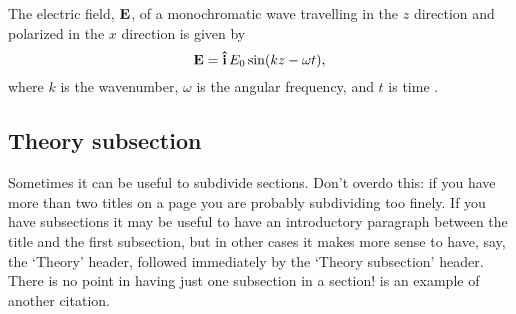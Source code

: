 \documentclass[11pt]{article} %
\newcommand{\citet}{\cite} %
\begin{document}
 The electric field, ${\bf E}$, of a monochromatic wave travelling in the $z$ direction and polarized in the $x$ direction is given by
%
%
\begin{equation}
\label{secondlaw}
{\bf E} = {\bf  \hat{i}}\, E_0 \sin(kz - \omega t),
\label{eq:wave}
\end{equation}
%
%
where $k$ is the wavenumber, $\omega$ is the angular frequency, and $t$ is time \cite{Morin2008}.



\subsection{Theory subsection}
Sometimes it can be useful to subdivide sections. Don’t overdo this: if you have more than two titles on a page you are probably subdividing too finely. If you have subsections it may be useful to have an introductory paragraph between the title and the first subsection, but in other cases it makes more sense to have, say, the ‘Theory’ header, followed immediately by the ‘Theory subsection’ header. There is no point in having just one subsection in a section! \citet{Einstein1905} is an example of another citation.

\end{document}
